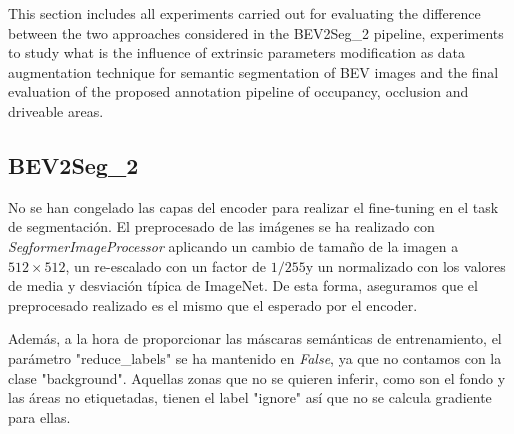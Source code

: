 
This section includes all experiments carried out for evaluating the difference between the two approaches considered in the BEV2Seg\_2 pipeline, experiments to study what is the influence of extrinsic parameters modification as data augmentation technique for semantic segmentation of BEV images and the final evaluation of the proposed annotation pipeline of occupancy, occlusion and driveable areas.

\subsection{BEV2Seg\_2}
No se han congelado las capas del encoder para realizar el fine-tuning en el task de segmentación. El preprocesado de las imágenes se ha realizado con \textit{SegformerImageProcessor} aplicando un cambio de tamaño de la imagen a $512 \times 512$, un re-escalado con un factor de $1/255$y un normalizado con los valores de media y desviación típica de ImageNet. De esta forma, aseguramos que el preprocesado realizado es el mismo que el esperado por el encoder.

Además, a la hora de proporcionar las máscaras semánticas de entrenamiento, el parámetro "reduce\_labels" se ha mantenido en \textit{False}, ya que no contamos con la clase "background". Aquellas zonas que no se quieren inferir, como son el fondo y las áreas no etiquetadas, tienen el label "ignore" así que no se calcula gradiente para ellas.
